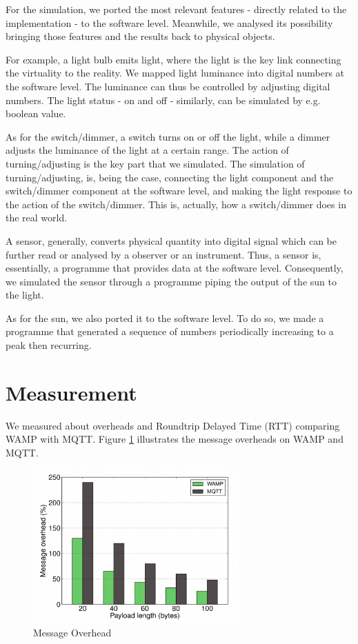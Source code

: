 For the simulation, we ported the most relevant features - directly related to the implementation - to the software level. Meanwhile, we analysed its possibility bringing those features and the results back to physical objects. 

For example, a light bulb emits light, where the light is the key link connecting the virtuality to the reality. We mapped light luminance into digital numbers at the software level. The luminance can thus be controlled by adjusting digital numbers. The light status - on and off - similarly, can be simulated by e.g. boolean value. 

As for the switch/dimmer, a switch turns on or off the light, while a dimmer adjusts the luminance of the light at a certain range. The action of turning/adjusting is the key part that we simulated. The simulation of turning/adjusting, is, being the case, connecting the light component and the switch/dimmer component at the software level, and making the light response to the action of the switch/dimmer. This is, actually, how a switch/dimmer does in the real world.

A sensor, generally, converts physical quantity into digital signal which can be further read or analysed by a observer or an instrument. Thus, a sensor is, essentially, a programme that provides data at the software level. Consequently, we simulated the sensor through a programme piping the output of the sun to the light.

As for the sun, we also ported it to the software level. To do so, we made a programme that generated a sequence of numbers periodically increasing to a peak then recurring.

\section{Measurement}
We measured about overheads and Roundtrip Delayed Time (RTT) comparing WAMP with MQTT. Figure \ref{fig:overhead} illustrates the message overheads on WAMP and MQTT.

\begin{figure}[ht]
  \begin{center}
    \includegraphics[width=0.7\textwidth]{images/overhead.pdf}
    \caption{Message Overhead}
    \label{fig:overhead}
  \end{center}
\end{figure}

